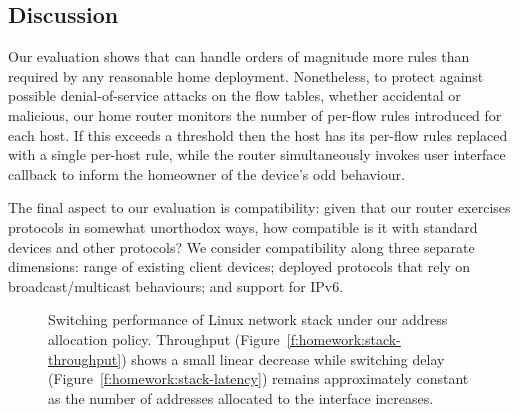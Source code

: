 \subsection{Discussion}

Our evaluation shows that \ovs can handle orders of magnitude more rules
than required by any reasonable home deployment.  Nonetheless, to protect
against possible denial-of-service attacks on the flow tables, whether
accidental or malicious, our home router monitors the number of
per-flow rules introduced for each host.  If this exceeds a threshold then
the host has its per-flow rules replaced with a single per-host rule, while the
router simultaneously invokes user interface callback to inform the homeowner of the
device's odd behaviour. 

The final aspect to our evaluation is compatibility: given that our router
exercises protocols in somewhat unorthodox ways, how compatible is it with
standard devices and other protocols?  We consider compatibility along three
separate dimensions: range of existing client devices; deployed protocols that
rely on broadcast/multicast behaviours; and support for IPv6. 

\begin{figure} 
  \centering 
  \caption[Switching performance of Linux network]{\label{f:stack-throughput}Switching performance of Linux network
    stack under our address allocation policy. Throughput
    (Figure~\ref{f:homework:stack-throughput}) shows a
    small linear decrease while switching delay
    (Figure~\ref{f:homework:stack-latency}) remains
    approximately constant as the number of addresses allocated to the interface
    increases.} \end{figure}

